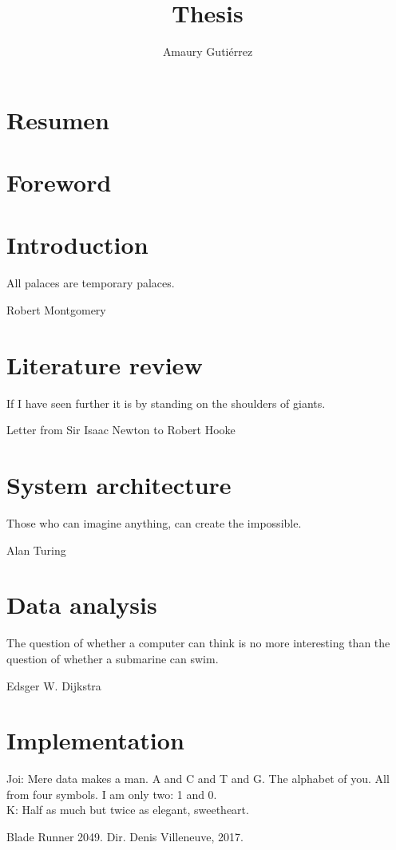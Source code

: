 \documentclass[12pt,letterpaper]{book}
\author{Amaury Guti\'errez}
\title{Thesis}
\theoremstyle{definition} \newtheorem{definition}{Definición}[section]
\theoremstyle{plain} \newtheorem{theorem}{Teorema}[section]
\theoremstyle{plain} \newtheorem{lemma}{Lema}[section]
\theoremstyle{plain} \newtheorem{proposition}[theorem]{Proposici\'on}
\theoremstyle{plain} \newtheorem{corollary}[theorem]{Corolario}
\theoremstyle{plain} \newtheorem{remark}[theorem]{Comentario}
\begin{document}
\frontmatter



\chapter*{Resumen}






\tableofcontents
\chapter{Foreword}


\mainmatter

\chapter{Introduction}
\epigraph{All palaces are temporary palaces.}{Robert Montgomery}


\chapter{Literature review}
\epigraph{If I have seen further it is by standing on the shoulders of giants.}{Letter from Sir Isaac Newton to Robert Hooke}


\chapter{System architecture}
\epigraph{Those who can imagine anything, can create the impossible.}{Alan Turing}


\chapter{Data analysis}
\epigraph{The question of whether a computer can think is no more interesting than the question of whether a submarine can swim.}{Edsger W. Dijkstra}


\chapter{Implementation}
\epigraph{Joi: Mere data makes a man. A and C and T and G. The alphabet of you. All from four symbols. I am only two: 1 and 0.\\
K: Half as much but twice as elegant, sweetheart.}{Blade Runner 2049. Dir. Denis Villeneuve, 2017.}

\end{document}
